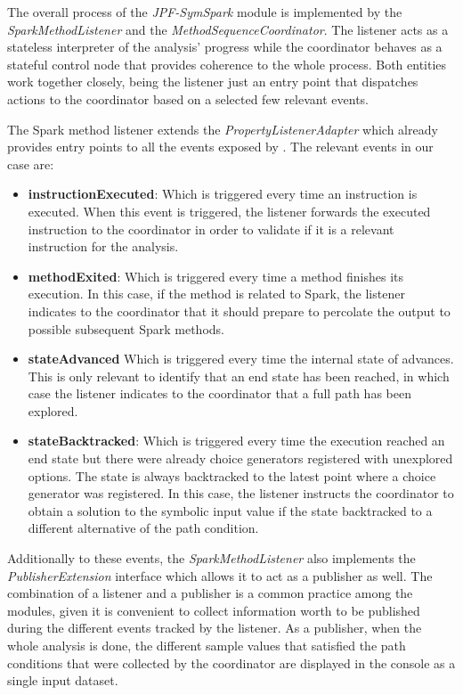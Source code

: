 
The overall process of the \textit{JPF-SymSpark} module is implemented by the \textit{SparkMethodListener} and the \textit{MethodSequenceCoordinator}. The listener acts as a stateless interpreter of the analysis' progress while the coordinator behaves as a stateful control node that provides coherence to the whole process. Both entities work together closely, being the listener just an entry point that dispatches actions to the coordinator based on a selected few relevant events.


The Spark method listener extends the \textit{PropertyListenerAdapter} which already provides entry points to all the events exposed by \jpf{}. The relevant events in our case are:

\begin{itemize}
	\item \textbf{instructionExecuted}: Which is triggered every time an instruction is executed. When this event is triggered, the listener forwards the executed instruction to the coordinator in order to validate if it is a relevant instruction for the analysis.
	\item \textbf{methodExited}: Which is triggered every time a method finishes its execution. In this case, if the method is related to Spark, the listener indicates to the coordinator that it should prepare to percolate the output to possible subsequent Spark methods.
	\item \textbf{stateAdvanced} Which is triggered every time the internal state of \jpf{} advances. This is only relevant to identify that an end state has been reached, in which case the listener indicates to the coordinator that a full path has been explored.
	\item \textbf{stateBacktracked}: Which is triggered every time the execution reached an end state but there were already choice generators registered with unexplored options. The state is always backtracked to the latest point where a choice generator was registered. In this case, the listener instructs the coordinator to obtain a solution to the symbolic input value if the state backtracked to a different alternative of the path condition.
\end{itemize}

Additionally to these events, the \textit{SparkMethodListener} also implements the \textit{PublisherExtension} interface which allows it to act as a publisher as well. The combination of a listener and a publisher is a common practice among the \jpf{} modules, given it is convenient to collect information worth to be published during the different events tracked by the listener. As a publisher, when the whole analysis is done, the different sample values that satisfied the path conditions that were collected by the coordinator are displayed in the console as a single input dataset.

